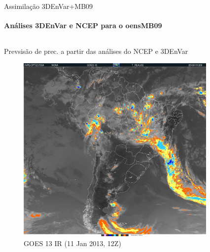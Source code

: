 \documentclass[10pt,aspectratio=169]{beamer}
\begin{document}
\begin{frame}{Assimilação 3DEnVar+MB09}
\framesubtitle{Análises 3DEnVar e NCEP para o oensMB09}
	\begin{columns}[t]
	    \vspace{2em}
    	\begin{column}{.45\textwidth}
    		\centering
    		Prevsisão de prec. a partir das análises do NCEP e 3DEnVar
        	\begin{figure}[t]
				\centering
				\includegraphics[width=0.8\linewidth]{./figs/goes13.jpg}
				\caption{GOES 13 IR (11 Jan 2013, 12Z)}
			\end{figure}
        \end{column}
        \begin{column}{.5\textwidth}
        	\begin{figure}[H]
        		\vspace{-2em}
				\centering

\end{figure}
\end{column}
\end{columns}
\end{frame}
\end{document}
